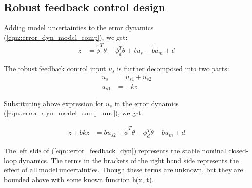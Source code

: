 \subsection{Robust feedback control design}

Adding model uncertainties to the error dynamics
(\ref{eqn::error_dyn_model_comp}), we get:
\begin{align}
    \dot z &= \tilde \phi^T \theta - \phi^T_d \tilde \theta + bu_s - \tilde b u_m  + d\label{eqn::error_dyn_model_comp_unc}
\end{align}

The robust feedback control input $u_s$ is further decomposed into two parts:
\begin{align}
    u_s &= u_{s1} + u_{s2}\\
    u_{s1} &= - k z
\end{align}

Substituting above expression for $u_s$ in the error dynamics
(\ref{eqn::error_dyn_model_comp_unc}), we get:

\begin{align}
    \dot z + bk z &= bu_{s2} + \tilde \phi^T \theta - \phi^T_d \tilde \theta - \tilde b u_m  + d
    \label{eqn::error_feedback_dyn}
\end{align}

The left side of (\ref{eqn::error_feedback_dyn}) represents the stable nominal
closed-loop dynamics. The terms in the brackets of the right hand side
represents the effect of all model uncertainties. Though these terms are
unknown, but they are bounded above with some known function h(x, t).
